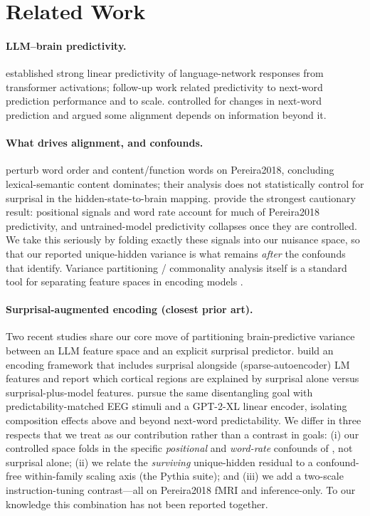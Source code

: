 \documentclass{article}
\begin{document}
\section{Related Work}
\label{sec:related}

\paragraph{LLM--brain predictivity.} \citet{schrimpf2021} established strong linear predictivity
of language-network responses from transformer activations; follow-up work related predictivity
to next-word prediction performance and to scale. \citet{merlin2022} controlled for changes in
next-word prediction and argued some alignment depends on information beyond it.

\paragraph{What drives alignment, and confounds.} \citet{kauf2023} perturb word order and
content/function words on Pereira2018, concluding lexical-semantic content dominates; their
analysis does not statistically control for surprisal in the hidden-state-to-brain mapping.
\citet{feghhi2024} provide the strongest cautionary result: positional signals and word rate
account for much of Pereira2018 predictivity, and untrained-model predictivity collapses once
they are controlled. We take this seriously by folding exactly these signals into our nuisance
space, so that our reported unique-hidden variance is what remains \emph{after} the confounds
that \citet{feghhi2024} identify. Variance partitioning / commonality analysis itself is a
standard tool for separating feature spaces in encoding models \citep{deheer2017}.

\paragraph{Surprisal-augmented encoding (closest prior art).} Two recent studies share our core
move of partitioning brain-predictive variance between an LLM feature space and an explicit
surprisal predictor. \citet{lepori2026} build an encoding framework that includes surprisal
alongside (sparse-autoencoder) LM features and report which cortical regions are explained by
surprisal alone versus surprisal-plus-model features. \citet{zhao2026} pursue the same
disentangling goal with predictability-matched EEG stimuli and a GPT-2-XL linear encoder,
isolating composition effects above and beyond next-word predictability. We differ in three
respects that we treat as our contribution rather than a contrast in goals: (i) our controlled
space folds in the specific \emph{positional} and \emph{word-rate} confounds of
\citet{feghhi2024}, not surprisal alone; (ii) we relate the \emph{surviving} unique-hidden
residual to a confound-free within-family scaling axis (the Pythia suite); and (iii) we add a
two-scale instruction-tuning contrast---all on Pereira2018 fMRI and inference-only. To our
knowledge this combination has not been reported together.
\end{document}
